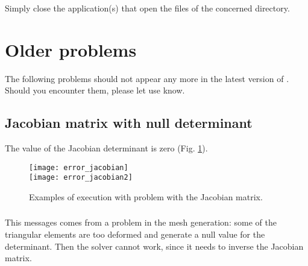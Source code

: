\subsubsection{\answer}

Simply close the application(s) that open the files of the concerned directory.





\section{Older problems}


The following problems should not appear any more in the latest version of \diva. Should you encounter them, please let use know.


\subsection{Jacobian matrix with null determinant}

The value of the Jacobian determinant is zero (Fig. \ref{fig:error_jacobian}).
\begin{figure}[htpb]
\centering
\texttt{[image: error\_jacobian]}\\
\texttt{[image: error\_jacobian2]}
\caption{Examples of \diva execution with problem with the Jacobian matrix. \label{fig:error_jacobian}}
\end{figure}

\subsubsection{\question}

This messages comes from a problem in the mesh generation: some of the triangular elements are too deformed and generate a null value for the determinant. Then the solver cannot work, since it needs to inverse the Jacobian matrix.


\subsubsection{\answer}

